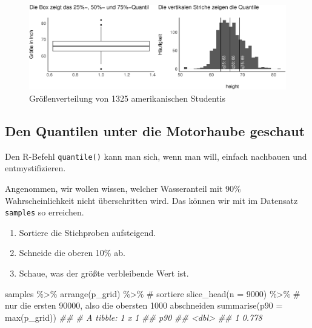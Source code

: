 \documentclass[
  a4paper,
  DIV=11]{scrreprt}
\newenvironment{Shaded}{\begin{snugshade}}{\end{snugshade}}
\newcommand{\AttributeTok}[1]{\textcolor[rgb]{0.40,0.45,0.13}{#1}}
\newcommand{\CommentTok}[1]{\textcolor[rgb]{0.37,0.37,0.37}{#1}}
\newcommand{\DecValTok}[1]{\textcolor[rgb]{0.68,0.00,0.00}{#1}}
\newcommand{\DocumentationTok}[1]{\textcolor[rgb]{0.37,0.37,0.37}{\textit{#1}}}
\newcommand{\FunctionTok}[1]{\textcolor[rgb]{0.28,0.35,0.67}{#1}}
\newcommand{\NormalTok}[1]{\textcolor[rgb]{0.00,0.23,0.31}{#1}}
\newcommand{\SpecialCharTok}[1]{\textcolor[rgb]{0.37,0.37,0.37}{#1}}
\providecommand{\tightlist}{%
  \setlength{\itemsep}{0pt}\setlength{\parskip}{0pt}}\usepackage{longtable,booktabs,array}
\theoremstyle{definition}
\theoremstyle{remark}
\begin{document}
\begin{figure}

{\centering \includegraphics{./Post_files/figure-pdf/fig-stud-height-1.pdf}

}

\caption{\label{fig-stud-height}Größenverteilung von 1325 amerikanischen
Studentis}

\end{figure}

\hypertarget{den-quantilen-unter-die-motorhaube-geschaut}{%
\subsection{Den Quantilen unter die Motorhaube
geschaut}\label{den-quantilen-unter-die-motorhaube-geschaut}}

Den R-Befehl \texttt{quantile()} kann man sich, wenn man will, einfach
nachbauen und entmystifizieren.

Angenommen, wir wollen wissen, welcher Wasseranteil mit 90\%
Wahrscheinlichkeit nicht überschritten wird. Das können wir mit im
Datensatz \texttt{samples} so erreichen.

\begin{enumerate}
\def\labelenumi{\arabic{enumi}.}
\tightlist
\item
  Sortiere die Stichproben aufsteigend.
\item
  Schneide die oberen 10\% ab.
\item
  Schaue, was der größte verbleibende Wert ist.
\end{enumerate}

\begin{Shaded}
\begin{Highlighting}[]
\NormalTok{samples }\SpecialCharTok{\%\textgreater{}\%} 
  \FunctionTok{arrange}\NormalTok{(p\_grid) }\SpecialCharTok{\%\textgreater{}\%}   \CommentTok{\# sortiere}
  \FunctionTok{slice\_head}\NormalTok{(}\AttributeTok{n =} \DecValTok{9000}\NormalTok{) }\SpecialCharTok{\%\textgreater{}\%}  \CommentTok{\# nur die ersten 90000, also die obersten 1000 abschneiden}
  \FunctionTok{summarise}\NormalTok{(}\AttributeTok{p90 =} \FunctionTok{max}\NormalTok{(p\_grid))}
\DocumentationTok{\#\# \# A tibble: 1 x 1}
\DocumentationTok{\#\#     p90}
\DocumentationTok{\#\#   \textless{}dbl\textgreater{}}
\DocumentationTok{\#\# 1 0.778}
\end{Highlighting}
\end{Shaded}
\end{document}

